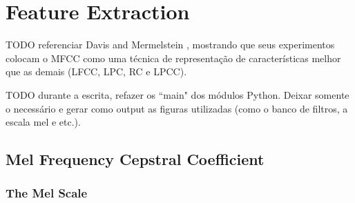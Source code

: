 \chapter{Feature Extraction}

TODO referenciar Davis and Mermelstein \autocite{stevenb.davispaulmermelstein1980},
mostrando que seus experimentos colocam o MFCC como uma técnica de representação
de características melhor que as demais (LFCC, LPC, RC e LPCC).

TODO durante a escrita, refazer os ``main" dos módulos Python. Deixar somente o
necessário e gerar como output as figuras utilizadas (como o banco de filtros,
a escala mel e etc.).


\section{Mel Frequency Cepstral Coefficient}


\subsection{The Mel Scale}